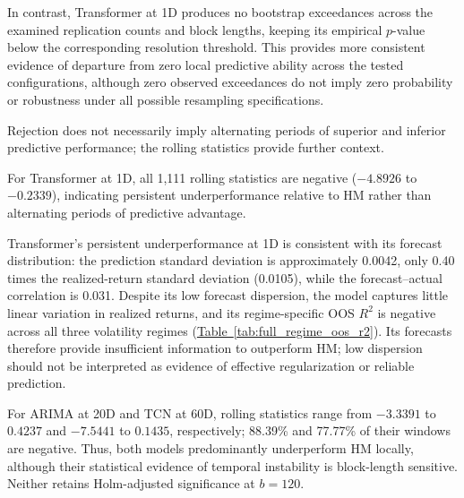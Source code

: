 \documentclass[runningheads,orivec]{llncs}
\begin{document}
In contrast, Transformer at 1D produces no bootstrap exceedances across the examined replication counts and block lengths, keeping its empirical $p$-value below the corresponding resolution threshold. This provides more consistent evidence of departure from zero local predictive ability across the tested configurations, although zero observed exceedances do not imply zero probability or robustness under all possible resampling specifications.

Rejection does not necessarily imply alternating periods of superior and inferior predictive performance; the rolling statistics provide further context.

For Transformer at 1D, all 1,111 rolling statistics are negative ($-4.8926$ to $-0.2339$), indicating persistent underperformance relative to HM rather than alternating periods of predictive advantage.

Transformer's persistent underperformance at 1D is consistent with its forecast distribution: the prediction standard deviation is approximately 0.0042, only 0.40 times the realized-return standard deviation (0.0105), while the forecast--actual correlation is 0.031. Despite its low forecast dispersion, the model captures little linear variation in realized returns, and its regime-specific OOS $R^2$ is negative across all three volatility regimes (\hyperref[tab:full_regime_oos_r2]{Table~\ref*{tab:full_regime_oos_r2}}). Its forecasts therefore provide insufficient information to outperform HM; low dispersion should not be interpreted as evidence of effective regularization or reliable prediction.

For ARIMA at 20D and TCN at 60D, rolling statistics range from $-3.3391$ to $0.4237$ and $-7.5441$ to $0.1435$, respectively; 88.39\% and 77.77\% of their windows are negative. Thus, both models predominantly underperform HM locally, although their statistical evidence of temporal instability is block-length sensitive. Neither retains Holm-adjusted significance at $b=120$.
\end{document}
